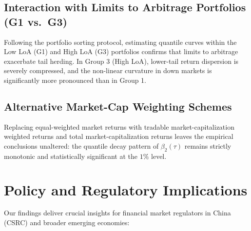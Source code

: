\documentclass[12pt, a4paper]{article}
\begin{document}
\subsection{Interaction with Limits to Arbitrage Portfolios (G1 vs.\ G3)}

Following the portfolio sorting protocol, estimating quantile curves within the Low LoA (G1) and High LoA (G3) portfolios confirms that limits to arbitrage exacerbate tail herding. In Group 3 (High LoA), lower-tail return dispersion is severely compressed, and the non-linear curvature in down markets is significantly more pronounced than in Group 1.

\subsection{Alternative Market-Cap Weighting Schemes}

Replacing equal-weighted market returns with tradable market-capitalization weighted returns and total market-capitalization returns leaves the empirical conclusions unaltered: the quantile decay pattern of $\beta_2(\tau)$ remains strictly monotonic and statistically significant at the $1\%$ level.

\section{Policy and Regulatory Implications}

Our findings deliver crucial insights for financial market regulators in China (CSRC) and broader emerging economies:
\end{document}
